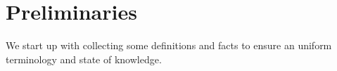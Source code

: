 \chapter{Preliminaries}
\label{sec:preliminaries}

We start up with collecting some definitions and facts to ensure an uniform terminology and state of knowledge.






